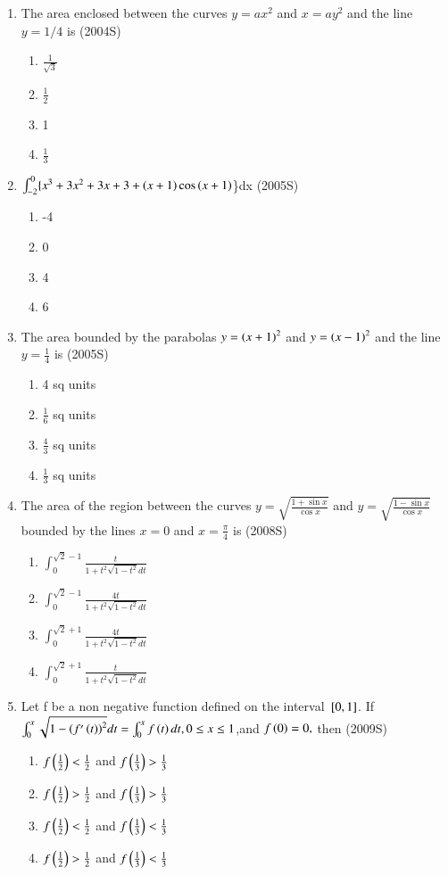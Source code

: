 \documentclass[journal,12pt,twocolumn]{IEEEtran}
\theoremstyle{remark}
\begin{document}
\begin{enumerate}
\begin{enumerate}
 \end{enumerate}
 \item The area enclosed between the curves $y=ax^{2}$ and $x=ay^{2}$ and the line $y=1/4$ is
	 \hfill(2004S)
 \begin{enumerate}
	 \item $\frac{1}{\sqrt{3}}$
	 \item $\frac{1}{2}$
     \item 1
     \item $\frac{1}{3}$
 \end{enumerate}
 \item $\int_{-2}^{0}\{x^{3}+3x^{2}+3x+3+\left(x+1\right)\cos\left(x+1\right)$\}dx
	 \hfill(2005S)
\begin{enumerate}
 \item -4
 \item 0
 \item 4
 \item 6
\end{enumerate}
  \item The area bounded by the parabolas $y=\left(x+1\right)^2$ and $y=\left(x-1\right)^2$ and the line $y=\frac{1}{4}$ is
	  \hfill(2005S)
\begin{enumerate}
    \item 4 sq units
    \item $\frac{1}{6}$ sq units
    \item $\frac{4}{3}$ sq units
    \item $\frac{1}{3}$ sq units
\end{enumerate}
 \item The area of the region between the curves $y=\sqrt{\frac{1+\sin x}{\cos x}}$ and $y=\sqrt{\frac{1-\sin x}{\cos x}}$ bounded by the lines $x=0$ and $x=\frac{\pi}{4}$ is
	 \hfill(2008S)
\begin{enumerate}
    \item $\int_{0}^{\sqrt{2}-1}\frac{t}{1+t^{2}\sqrt{1-t^{2}}dt}$
       \item $\int_{0}^{\sqrt{2}-1}\frac{4t}{1+t^{2}\sqrt{1-t^{2}}dt}$
      \item $\int_{0}^{\sqrt{2}+1}\frac{4t}{1+t^{2}\sqrt{1-t^{2}}dt}$ 
         \item $\int_{0}^{\sqrt{2}+1}\frac{t}{1+t^{2}\sqrt{1-t^{2}}dt}$
\end{enumerate}
\item Let f be a non negative function defined on the interval ${}\left[0,1\right]$. If $\int_{0}^{x}\sqrt{1-\left(f'\left(t\right)\right)^{2}}dt=\int_{0}^{x}f\left(t\right)dt,0\leq{x}\leq1$,and $f\left(0\right)=0,$ then
	\hfill(2009S)
\begin{enumerate}
    \item$ f\left(\frac{1}{2}\right)<\frac{1}{2}$ and $f\left(\frac{1}{3}\right)>\frac{1}{3}$
    \item$ f\left(\frac{1}{2}\right)>\frac{1}{2}$ and $f\left(\frac{1}{3}\right)>\frac{1}{3}$
  \item$ f\left(\frac{1}{2}\right)<\frac{1}{2}$ and $f\left(\frac{1}{3}\right)<\frac{1}{3}$
  \item$ f\left(\frac{1}{2}\right)>\frac{1}{2}$ and $f\left(\frac{1}{3}\right)<\frac{1}{3}$
\end{enumerate}
\end{enumerate}
\end{document}
